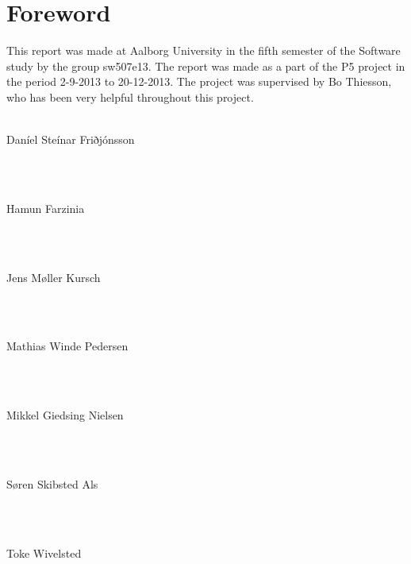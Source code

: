 \chapter*{Foreword}
\noindent This report was made at Aalborg University in the fifth semester of the Software study by the group sw507e13. The report was made as a part of the P5 project in the period 2-9-2013 to 20-12-2013. The project was supervised by Bo Thiesson, who has been very helpful throughout this project. \\ \\

\noindent
\vspace{5mm}
\parbox[h]{4cm}{Daníel Steínar Friðjónsson}\hspace{0.5cm} \makebox[7cm]{\hrulefill} \\ \\
\vspace{5mm}
\parbox[h]{4cm}{Hamun Farzinia}\hspace{0.5cm} \makebox[7cm]{\hrulefill} \\ \\
\vspace{5mm}
\parbox[h]{4cm}{Jens M\o ller Kursch}\hspace{0.5cm} \makebox[7cm]{\hrulefill} \\ \\
\vspace{5mm}
\parbox[h]{4cm}{Mathias Winde Pedersen}\hspace{0.5cm} \makebox[7cm]{\hrulefill} \\ \\
\vspace{5mm}
\parbox[h]{4cm}{Mikkel Giedsing Nielsen}\hspace{0.5cm} \makebox[7cm]{\hrulefill} \\ \\
\vspace{5mm}
\parbox[h]{4cm}{S\o ren Skibsted Als}\hspace{0.5cm} \makebox[7cm]{\hrulefill} \\ \\
\vspace{5mm}
\parbox[h]{4cm}{Toke Wivelsted}\hspace{0.5cm} \makebox[7cm]{\hrulefill} \\ \\

\newpage